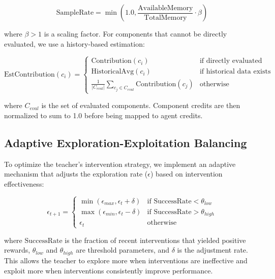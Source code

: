 \documentclass[twoside,11pt]{article}
\begin{document}
\begin{equation}
\text{SampleRate} = \min\left(1.0, \frac{\text{AvailableMemory}}{\text{TotalMemory}} \cdot \beta\right)
\end{equation}

where $\beta > 1$ is a scaling factor. For components that cannot be directly evaluated, we use a history-based estimation:

\begin{equation}
\text{EstContribution}(c_i) = 
\begin{cases}
\text{Contribution}(c_i) & \text{if directly evaluated} \\
\text{HistoricalAvg}(c_i) & \text{if historical data exists} \\
\frac{1}{|C_{eval}|} \sum_{c_j \in C_{eval}} \text{Contribution}(c_j) & \text{otherwise}
\end{cases}
\end{equation}

where $C_{eval}$ is the set of evaluated components. Component credits are then normalized to sum to 1.0 before being mapped to agent credits.

\subsection{Adaptive Exploration-Exploitation Balancing}

To optimize the teacher's intervention strategy, we implement an adaptive mechanism that adjusts the exploration rate ($\epsilon$) based on intervention effectiveness:

\begin{equation}
\epsilon_{t+1} = 
\begin{cases}
\min(\epsilon_{max}, \epsilon_t + \delta) & \text{if } \text{SuccessRate} < \theta_{low} \\
\max(\epsilon_{min}, \epsilon_t - \delta) & \text{if } \text{SuccessRate} > \theta_{high} \\
\epsilon_t & \text{otherwise}
\end{cases}
\end{equation}

where $\text{SuccessRate}$ is the fraction of recent interventions that yielded positive rewards, $\theta_{low}$ and $\theta_{high}$ are threshold parameters, and $\delta$ is the adjustment rate. This allows the teacher to explore more when interventions are ineffective and exploit more when interventions consistently improve performance.
\end{document}
